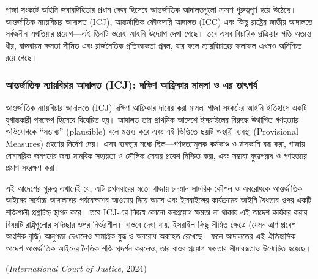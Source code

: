 গাজা সংকটে আইনি জবাবদিহিতার প্রধান ক্ষেত্র হিসেবে আন্তর্জাতিক আদালতগুলো ক্রমশ
গুরুত্বপূর্ণ হয়ে উঠেছে। আন্তর্জাতিক ন্যায়বিচার আদালত (ICJ), আন্তর্জাতিক ফৌজদারি
আদালত (ICC) এবং কিছু রাষ্ট্রের জাতীয় আদালতে সর্বজনীন এখতিয়ার প্রয়োগ---এই
তিনটি স্তরেই আইনি উদ্যোগ দেখা গেছে। তবে এসব বিচারিক প্রক্রিয়ার গতি অত্যন্ত
ধীর, বাস্তবায়ন ক্ষমতা সীমিত এবং রাজনৈতিক প্রতিবন্ধকতা প্রবল, যার ফলে
ন্যায়বিচারের ফলাফল এখনও অনিশ্চিত রয়ে গেছে।

\subsubsection{আন্তর্জাতিক ন্যায়বিচার আদালত (ICJ): দক্ষিণ আফ্রিকার
মামলা ও এর
তাৎপর্য}\label{ux986ux9a8ux9a4ux9b0ux99cux9a4ux995-ux9a8ux9afux9dfux9acux99aux9b0-ux986ux9a6ux9b2ux9a4-icj-ux9a6ux995ux9b7ux9a3-ux986ux9abux9b0ux995ux9b0-ux9aeux9aeux9b2-ux993-ux98fux9b0-ux9a4ux9ceux9aaux9b0ux9af}

আন্তর্জাতিক ন্যায়বিচার আদালতে (ICJ) দক্ষিণ আফ্রিকার দায়ের করা মামলা গাজা
সংকটের আইনি ইতিহাসে একটি যুগান্তকারী পদক্ষেপ হিসেবে বিবেচিত হয়। আদালত তার
প্রাথমিক আদেশে ইসরাইলের বিরুদ্ধে উত্থাপিত গণহত্যার অভিযোগকে ``সম্ভাব্য''
(plausible) বলে মন্তব্য করে এবং এই ভিত্তিতে ছয়টি অস্থায়ী ব্যবস্থা (Provisional
Measures) গ্রহণের নির্দেশ দেয়। এসব ব্যবস্থার মধ্যে ছিল---গণহত্যামূলক কর্মকাণ্ড ও
উসকানি বন্ধ করা, গাজায় বেসামরিক জনগণের জন্য মানবিক সহায়তা ও মৌলিক সেবার
প্রবেশ নিশ্চিত করা, এবং সম্ভাব্য যুদ্ধাপরাধ ও গণহত্যার প্রমাণ সংরক্ষণ করা।

এই আদেশের গুরুত্ব এখানেই যে, এটি প্রথমবারের মতো গাজায় চলমান সামরিক কৌশল ও
অবরোধকে আন্তর্জাতিক আইনের সর্বোচ্চ আদালতের পর্যবেক্ষণের আওতায় নিয়ে আসে এবং
ইসরাইলের কার্যক্রমের আইনি বৈধতার ওপর একটি শক্তিশালী প্রশ্নচিহ্ন স্থাপন করে। তবে
ICJ-এর নিজস্ব কোনো বলপ্রয়োগ ক্ষমতা না থাকায় এই আদেশ কার্যকর করার বিষয়টি
রাষ্ট্রগুলোর সদিচ্ছার ওপর নির্ভরশীল। বাস্তবে দেখা যায়, ইসরাইল কিছু সীমিত ক্ষেত্রে
(যেমন ত্রাণ প্রবেশ আংশিক বৃদ্ধি) আনুগত্য দেখালেও সামগ্রিক যুদ্ধ ও অবরোধ অব্যাহত
রেখেছে। ফলে আদালতের এই ঐতিহাসিক আদেশ আন্তর্জাতিক আইনের নৈতিক শক্তি প্রদর্শন
করলেও, তার বাস্তব প্রয়োগ ক্ষমতার সীমাবদ্ধতাও উন্মোচিত হয়েছে।

(\emph{International Court of Justice}, 2024)

\vspace{0.3em}

